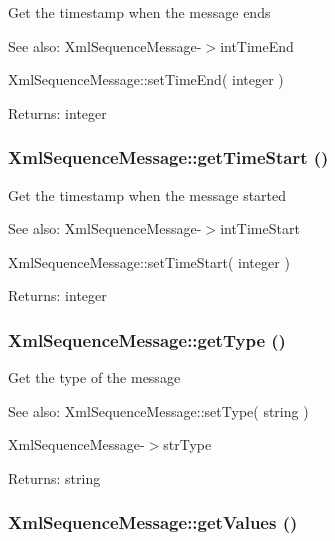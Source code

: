 Get the timestamp when the message ends

\begin{Desc}
\item[See also:]XmlSequenceMessage-$>$intTimeEnd 

XmlSequenceMessage::setTimeEnd( integer ) \end{Desc}
\begin{Desc}
\item[Returns:]integer \end{Desc}
\hypertarget{class_xml_sequence_message_27b24a732d56e0b1cf7fd755d2c52983}{
\subsubsection[{getTimeStart}]{\setlength{\rightskip}{0pt plus 5cm}XmlSequenceMessage::getTimeStart ()}}
\label{class_xml_sequence_message_27b24a732d56e0b1cf7fd755d2c52983}


Get the timestamp when the message started

\begin{Desc}
\item[See also:]XmlSequenceMessage-$>$intTimeStart 

XmlSequenceMessage::setTimeStart( integer ) \end{Desc}
\begin{Desc}
\item[Returns:]integer \end{Desc}
\hypertarget{class_xml_sequence_message_d839c7bfe476a42ddf264d019a13938b}{
\subsubsection[{getType}]{\setlength{\rightskip}{0pt plus 5cm}XmlSequenceMessage::getType ()}}
\label{class_xml_sequence_message_d839c7bfe476a42ddf264d019a13938b}


Get the type of the message

\begin{Desc}
\item[See also:]XmlSequenceMessage::setType( string ) 

XmlSequenceMessage-$>$strType \end{Desc}
\begin{Desc}
\item[Returns:]string \end{Desc}
\hypertarget{class_xml_sequence_message_9c2e8f8d995477aad79640ad673ab6a9}{
\subsubsection[{getValues}]{\setlength{\rightskip}{0pt plus 5cm}XmlSequenceMessage::getValues ()}}
\label{class_xml_sequence_message_9c2e8f8d995477aad79640ad673ab6a9}


